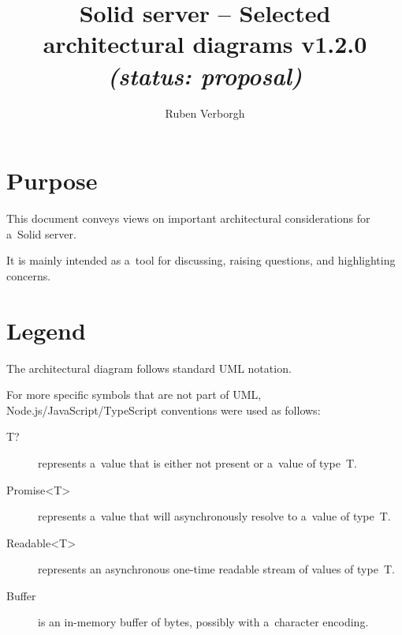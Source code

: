 \documentclass[10pt]{article}
\title{
  Solid server -- Selected architectural diagrams v1.2.0
  \it (status: proposal)
}
\author{Ruben Verborgh}
\begin{document}
\maketitle


\section*{Purpose}
This document conveys views
on important architectural considerations for a~Solid server.

It is mainly intended as a~tool for discussing,
raising questions,
and highlighting concerns.


\section*{Legend}
The architectural diagram follows standard UML notation.

For more specific symbols that are not part of UML,
Node.js/JavaScript/TypeScript conventions were used as follows:

\begin{description}
  \item[T?] represents a~value that is either not present
            or a~value of type~T.
  \item[Promise<T>] represents a~value that will asynchronously resolve
                    to a~value of type~T.
  \item[Readable<T>] represents an asynchronous one-time readable stream
                     of values of type~T.
  \item[Buffer] is an in-memory buffer of bytes,
                possibly with a~character encoding.
\end{description}


\newcommand\ResourceStoreBody{%
  + getRepresentation(ResourceIdentifier, RepresentationPreferences, Conditions?) : Promise<Representation>\\
  + addResource(container : ResourceIdentifier, Representation, Conditions?) : Promise<ResourceIdentifier>\\
  + setRepresentation(ResourceIdentifier, Representation, Conditions?) : Promise<void>\\
  + deleteResource(ResourceIdentifier, Conditions?) : Promise<void>\\
  + modifyResource(ResourceIdentifier, Patch, Conditions?) : Promise<void>\\
}
\end{document}

